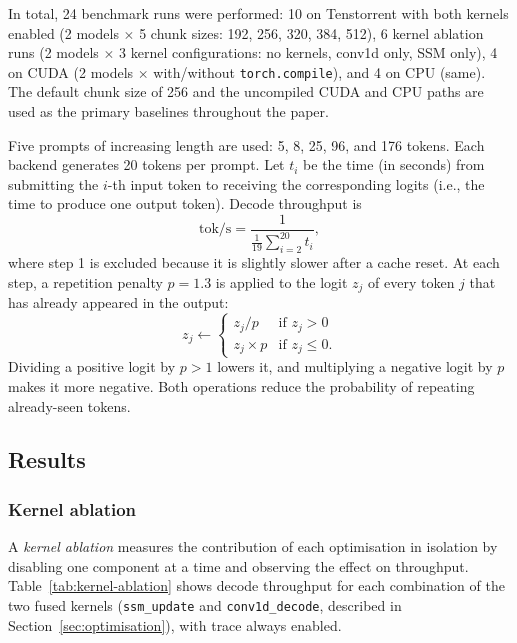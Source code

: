 In total, 24 benchmark runs were performed: 10 on Tenstorrent with both kernels enabled (2 models $\times$ 5 chunk sizes: 192, 256, 320, 384, 512), 6 kernel ablation runs (2 models $\times$ 3 kernel configurations: no kernels, conv1d only, SSM only), 4 on CUDA (2 models $\times$ with/without \texttt{torch.compile}), and 4 on CPU (same). The default chunk size of 256 and the uncompiled CUDA and CPU paths are used as the primary baselines throughout the paper.

Five prompts of increasing length are used: 5, 8, 25, 96, and 176 tokens. Each backend generates 20 tokens per prompt. Let $t_i$ be the time (in seconds) from submitting the $i$-th input token to receiving the corresponding logits (i.e., the time to produce one output token). Decode throughput is
\begin{equation}
  \text{tok/s} = \frac{1}{\frac{1}{19}\sum_{i=2}^{20} t_i},
  \label{eq:throughput}
\end{equation}
where step 1 is excluded because it is slightly slower after a cache reset. At each step, a repetition penalty $p{=}1.3$ is applied to the logit $z_j$ of every token $j$ that has already appeared in the output:
\begin{equation}
  z_j \leftarrow \begin{cases} z_j / p & \text{if } z_j > 0 \\ z_j \times p & \text{if } z_j \leq 0. \end{cases}
  \label{eq:rep-penalty}
\end{equation}
Dividing a positive logit by $p{>}1$ lowers it, and multiplying a negative logit by $p$ makes it more negative. Both operations reduce the probability of repeating already-seen tokens.

\subsection{Results}

\subsubsection{Kernel ablation}
\label{sec:eval-kernel-ablation}

A \emph{kernel ablation} measures the contribution of each optimisation in isolation by disabling one component at a time and observing the effect on throughput. Table~\ref{tab:kernel-ablation} shows decode throughput for each combination of the two fused kernels (\texttt{ssm\_update} and \texttt{conv1d\_decode}, described in Section~\ref{sec:optimisation}), with trace always enabled.

